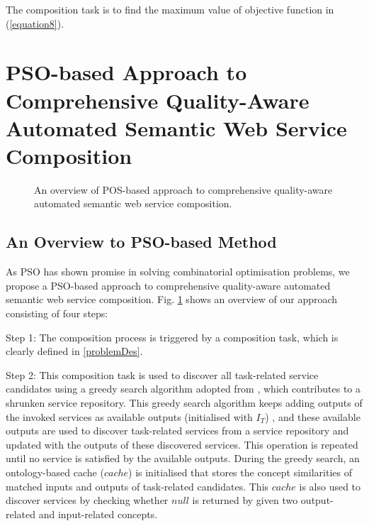 \documentclass{llncs}
\begin{document}
\noindent The composition task is to find the maximum value of objective function in (\ref{equation8}).


\section{PSO-based Approach to Comprehensive Quality-Aware Automated Semantic Web Service Composition}\label{qswsc_approach}
\vspace{-0.8cm}
\begin{figure}[h]
\centering
{}
 \caption{An overview of POS-based approach to comprehensive quality-aware automated semantic web service composition.}
 \label{overview}
\end{figure}
\vspace{-1.0cm}
\subsection{An Overview to PSO-based Method}\label{PSO_based_approach}

As PSO has shown promise in solving combinatorial optimisation problems, we propose a PSO-based approach to comprehensive quality-aware automated semantic web service composition. Fig. \ref{overview} shows an overview of our approach consisting of four steps: 

Step 1: The composition process is triggered by a composition task, which is clearly defined in \ref{problemDes}. 

Step 2: This composition task is used to discover all task-related service candidates using a greedy search algorithm adopted from \cite{ma2015hybrid}, which contributes to a shrunken service repository. This greedy search algorithm keeps adding outputs of the invoked services as available outputs (initialised with $I_{T}$) , and these available outputs are used to discover task-related services from a service repository and updated with the outputs of these discovered services. This operation is repeated until no service is satisfied by the available outputs. During the greedy search, an ontology-based cache ($cache$) is initialised that stores the concept similarities of matched inputs and outputs of task-related candidates. This $cache$ is also used to discover services by checking whether $null$ is returned by given two output-related and input-related concepts.
\end{document}
